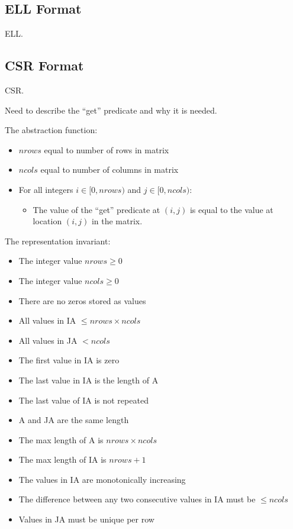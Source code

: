 \documentclass[11pt,conference]{IEEEtran}
\begin{document}
\subsection{ELL Format}

ELL.

\subsection{CSR Format}

CSR.

Need to describe the ``get'' predicate and why it is needed.

The abstraction function:

\begin{itemize}
  \item \(nrows\) equal to number of rows in matrix
  \item \(ncols\) equal to number of columns in matrix
  \item For all integers \(i \in [0, nrows)\) and \(j \in [0, ncols)\):
  \begin{itemize}
    \item The value of the ``get'' predicate at \((i, j)\) is equal to the value at location \((i, j)\) in the matrix.
  \end{itemize}
\end{itemize}

The representation invariant:

\begin{itemize}
  \item The integer value \(nrows \geq 0\)
  \item The integer value \(ncols \geq 0\)
	\item There are no zeros stored as values
	\item All values in IA \(\leq nrows \times ncols\)
	\item All values in JA \(< ncols\)
	\item The first value in IA is zero
	\item The last value in IA is the length of A
	\item The last value of IA is not repeated
	\item A and JA are the same length
	\item The max length of A is \(nrows \times ncols\)
	\item The max length of IA is \(nrows + 1\)
	\item The values in IA are monotonically increasing
	\item The difference between any two consecutive values in IA must be \(\leq ncols\)
	\item Values in JA must be unique per row
\end{itemize}



\end{document}
